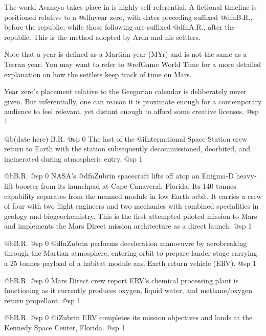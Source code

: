 
The world Avaneya takes place in is highly self-referential. A fictional timeline is positioned relative to a @dfn{year zero}, with dates preceding suffixed @dfn{B.R.}, before the republic; while those following are suffixed @dfn{A.R.}, after the republic. This is the method adopted by Arda and his settlers. 

Note that a year is defined as a Martian year (MYr) and is not the same as a Terran year. You may want to refer to @ref{Game World Time} for a more detailed explanation on how the settlers keep track of time on Mars.

Year zero's placement relative to the Gregorian calendar is deliberately never given. But inferentially, one can reason it is proximate enough for a contemporary audience to feel relevant, yet distant enough to afford some creative licenses.
@sp 1

@b{(date here) B.R.}
@sp 0
The last of the @i{International Space Station} crew return to Earth with the station subsequently decommissioned, deorbited, and incinerated during atmospheric entry.
@sp 1

@b{B.R.}
@sp 0
NASA's @dfn{Zubrin} spacecraft lifts off atop an Enigma-D heavy-lift booster from its launchpad at Cape Canaveral, Florida. Its 140 tonnes capability separates from the manned module in low Earth orbit. It carries a crew of four with two flight engineers and two mechanics with combined specialities in geology and biogeochemistry. This is the first attempted piloted mission to Mars and implements the Mars Direct mission architecture as a direct launch.
@sp 1

@b{B.R.}
@sp 0
@dfn{Zubrin} performs deceleration manoeuvre by aerobreaking through the Martian atmosphere, entering orbit to prepare lander stage carrying a 25 tonnes payload of a habitat module and Earth return vehicle (ERV).
@sp 1

@b{B.R.}
@sp 0
Mars Direct crew report ERV's chemical processing plant is functioning as it currently produces oxygen, liquid water, and methane/oxygen return propellant.
@sp 1

@b{B.R.}
@sp 0
@i{Zubrin ERV} completes its mission objectives and lands at the Kennedy Space Center, Florida.
@sp 1

